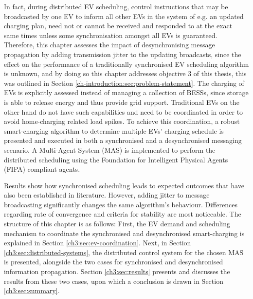 In fact, during distributed EV scheduling, control instructions that may be broadcasted by one EV to inform all other EVs in the system of e.g. an updated charging plan, need not or cannot be received and responded to at the exact same times unless some synchronisation amongst all EVs is guaranteed.
Therefore, this chapter assesses the impact of desynchronising message propagation by adding transmission jitter to the updating broadcasts, since the effect on the performance of a traditionally synchronised EV scheduling algorithm is unknown, and by doing so this chapter addresses objective 3 of this thesis, this was outlined in Section \ref{ch-introduction:sec:problem-statement}.
The charging of EVs is explicitly assessed instead of managing a collection of BESSs, since storage is able to release energy and thus provide grid support.
Traditional EVs on the other hand do not have such capabilities and need to be coordinated in order to avoid home-charging related load spikes.
To achieve this coordination, a robust smart-charging algorithm to determine multiple EVs' charging schedule is presented and executed in both a synchronised and a desynchronised messaging scenario.
A Multi-Agent System (MAS) is implemented to perform the distributed scheduling using the Foundation for Intelligent Physical Agents (FIPA) compliant agents.

Results show how synchronised scheduling leads to expected outcomes that have also been established in literature.
However, adding jitter to message broadcasting significantly changes the same algorithm's behaviour.
Differences regarding rate of convergence and criteria for stability are most noticeable.
The structure of this chapter is as follows:
First, the EV demand and scheduling mechanism to coordinate the synchronised and desynchronised smart-charging is explained in Section \ref{ch3:sec:ev-coordination}.
Next, in Section \ref{ch3:sec:distributed-systems}, the distributed control system for the chosen MAS is presented, alongside the two cases for synchronised and desynchronised information propagation.
Section \ref{ch3:sec:results} presents and discusses the results from these two cases, upon which a conclusion is drawn in Section \ref{ch3:sec:summary}.
